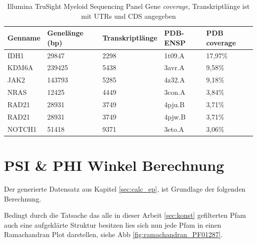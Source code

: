 \begin{table}[]
    \centering
    \begin{tabular}{lllll}
    \hline
    \multicolumn{1}{|l|}{Genname} & \multicolumn{1}{l|}{Genelänge (bp)} & \multicolumn{1}{l|}{Transkriptlänge} & \multicolumn{1}{l|}{PDB-ENSP} & \multicolumn{1}{l|}{PDB coverage} \\ \hline
    IDH1 & 29847 & 2298 & 1t09.A & 17,97\% \\
    KDM6A & 239425 & 5438 & 3avr.A & 9,58\% \\
    JAK2 & 143793 & 5285 & 4z32.A & 9,18\% \\
    NRAS & 12425 & 4449 & 3con.A & 3,84\% \\
    RAD21 & 28931 & 3749 & 4pju.B & 3,71\% \\
    RAD21 & 28931 & 3749 & 4pjw.B & 3,71\% \\
    NOTCH1 & 51418 & 9371 & 3eto.A & 3,06\% \\
    \end{tabular}
    \caption{Illumina TruSight Myeloid Sequencing Panel Gene \emph{coverage}, Transkriptlänge ist mit UTRs und CDS angegeben}
    \label{my-label}
\end{table}





\section{PSI \& PHI Winkel Berechnung}

Der generierte Datensatz aus Kapitel \ref{sec:calc_ep}, ist Grundlage der folgenden Berechnung.

Bedingt durch die Tatsache das alle in dieser Arbeit \ref{sec:konst} gefilterten \ac{Pfam} auch eine aufgeklärte Struktur besitzen lies sich nun jede \ac{Pfam} in einen Ramachandran Plot darstellen, siehe \ac{Abb} \ref{fig:ramachandran_PF01287}.


